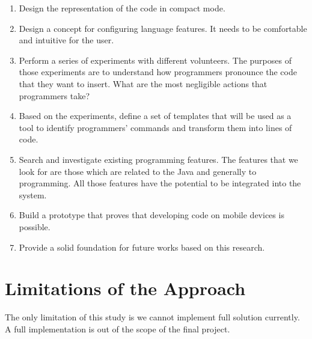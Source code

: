 \begin{enumerate}
	\item Design the representation of the code in compact mode.
	\item Design a concept for configuring language features. It needs to be comfortable and intuitive for the user.
	\item Perform a series of experiments with different volunteers. The purposes of those experiments are to understand how programmers pronounce the code that they want to insert. What are the most negligible actions that programmers take?
	\item Based on the experiments, define a set of templates that will be used as a tool to identify programmers’ commands and transform them into lines of code.
	\item Search and investigate existing programming features. The features that we look for are those which are related to the Java and generally to programming. All those features have the potential to be integrated into the system.
	\item Build a prototype that proves that developing code on mobile devices is possible.
	\item Provide a solid foundation for future works based on this research.
\end{enumerate}

\section{Limitations of the Approach}
The only limitation of this study is we cannot implement full solution currently. A full implementation is out of the scope of the final project.

